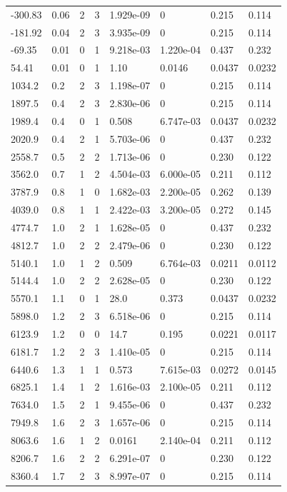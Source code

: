 \documentclass[preview]{standalone}
\begin{document}
{{\begin{tabular}{L{1.2cm}C{1.2cm} C{0.3cm}C{0.5cm} C{1.4cm}C{1.4cm} C{1.4cm}C{1.4cm}}
  -300.83  &  0.06  & 2     &  3 &  1.929e-09  & 0  & 0.215 &  0.114   \\ 
  -181.92  &  0.04  & 2     &  3 &  3.935e-09  & 0  & 0.215 &  0.114   \\ 
  -69.35  &  0.01  & 0     &  1 &  9.218e-03  & 1.220e-04  & 0.437 &  0.232   \\ 
  54.41  &  0.01  & 0     &  1 &  1.10  & 0.0146  & 0.0437 &  0.0232   \\ 
  1034.2  &   0.2  & 2     &  3 &  1.198e-07  & 0  & 0.215 &  0.114   \\ 
  1897.5  &   0.4  & 2     &  3 &  2.830e-06  & 0  & 0.215 &  0.114   \\ 
  1989.4  &   0.4  & 0     &  1 &  0.508  & 6.747e-03  & 0.0437 &  0.0232   \\ 
  2020.9  &   0.4  & 2     &  1 &  5.703e-06  & 0  & 0.437 &  0.232   \\ 
  2558.7  &   0.5  & 2     &  2 &  1.713e-06  & 0  & 0.230 &  0.122   \\ 
  3562.0  &   0.7  & 1     &  2 &  4.504e-03  & 6.000e-05  & 0.211 &  0.112   \\ 
  3787.9  &   0.8  & 1     &  0 &  1.682e-03  & 2.200e-05  & 0.262 &  0.139   \\ 
  4039.0  &   0.8  & 1     &  1 &  2.422e-03  & 3.200e-05  & 0.272 &  0.145   \\ 
  4774.7  &   1.0  & 2     &  1 &  1.628e-05  & 0  & 0.437 &  0.232   \\ 
  4812.7  &   1.0  & 2     &  2 &  2.479e-06  & 0  & 0.230 &  0.122   \\ 
  5140.1  &   1.0  & 1     &  2 &  0.509  & 6.764e-03  & 0.0211 &  0.0112   \\ 
  5144.4  &   1.0  & 2     &  2 &  2.628e-05  & 0  & 0.230 &  0.122   \\ 
  5570.1  &   1.1  & 0     &  1 &  28.0  & 0.373  & 0.0437 &  0.0232   \\ 
  5898.0  &   1.2  & 2     &  3 &  6.518e-06  & 0  & 0.215 &  0.114   \\ 
  6123.9  &   1.2  & 0     &  0 &  14.7  & 0.195  & 0.0221 &  0.0117   \\ 
  6181.7  &   1.2  & 2     &  3 &  1.410e-05  & 0  & 0.215 &  0.114   \\ 
  6440.6  &   1.3  & 1     &  1 &  0.573  & 7.615e-03  & 0.0272 &  0.0145   \\ 
  6825.1  &   1.4  & 1     &  2 &  1.616e-03  & 2.100e-05  & 0.211 &  0.112   \\ 
  7634.0  &   1.5  & 2     &  1 &  9.455e-06  & 0  & 0.437 &  0.232   \\ 
  7949.8  &   1.6  & 2     &  3 &  1.657e-06  & 0  & 0.215 &  0.114   \\ 
  8063.6  &   1.6  & 1     &  2 &  0.0161  & 2.140e-04  & 0.211 &  0.112   \\ 
  8206.7  &   1.6  & 2     &  2 &  6.291e-07  & 0  & 0.230 &  0.122   \\ 
  8360.4  &   1.7  & 2     &  3 &  8.997e-07  & 0  & 0.215 &  0.114   \\ 
\hline 
\end{tabular} 

}}
\end{document}
